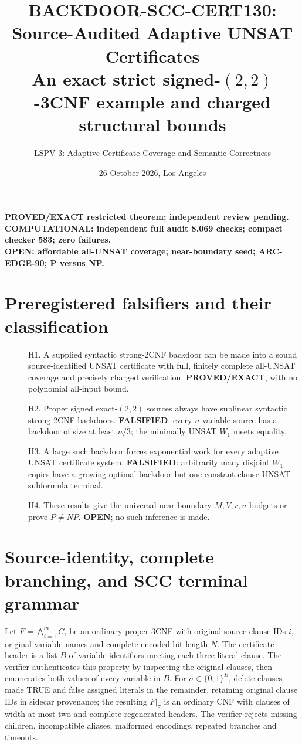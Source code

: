 \documentclass[11pt]{article}
\title{BACKDOOR-SCC-CERT130: Source-Audited Adaptive UNSAT Certificates\\
\large An exact strict signed-$(2,2)$-3CNF example and charged structural bounds}
\author{LSPV-3: Adaptive Certificate Coverage and Semantic Correctness}
\date{26 October 2026, Los Angeles}
\begin{document}
\maketitle
\begin{center}\textbf{PROVED/EXACT restricted theorem; independent review pending.}\\
\textbf{COMPUTATIONAL: independent full audit 8,069 checks; compact checker 583; zero failures.}\\
\textbf{OPEN: affordable all-UNSAT coverage; near-boundary seed; ARC-EDGE-90; P versus NP.}
\end{center}
\section{Preregistered falsifiers and their classification}
\begin{description}
\item[] H1. A supplied syntactic strong-2CNF backdoor can be made into a sound source-identified UNSAT certificate with full, finitely complete all-UNSAT coverage and precisely charged verification. \textbf{PROVED/EXACT}, with no polynomial all-input bound.
\item[] H2. Proper signed exact-$(2,2)$ sources always have sublinear syntactic strong-2CNF backdoors. \textbf{FALSIFIED}: every $n$-variable source has a backdoor of size at least $n/3$; the minimally UNSAT $W_1$ meets equality.
\item[] H3. A large such backdoor forces exponential work for every adaptive UNSAT certificate system. \textbf{FALSIFIED}: arbitrarily many disjoint $W_1$ copies have a growing optimal backdoor but one constant-clause UNSAT subformula terminal.
\item[] H4. These results give the universal near-boundary $M,V,r,u$ budgets or prove $P\ne NP$. \textbf{OPEN}; no such inference is made.
\end{description}
\section{Source-identity, complete branching, and SCC terminal grammar}
Let $F=\bigwedge_{i=1}^m C_i$ be an ordinary proper 3CNF with original source clause IDs $i$, original variable names and complete encoded bit length $N$. The certificate header is a list $B$ of variable identifiers meeting each three-literal clause. The verifier authenticates this property by inspecting the original clauses, then enumerates both values of every variable in $B$. For $\sigma\in\{0,1\}^B$, delete clauses made TRUE and false assigned literals in the remainder, retaining original clause IDs in sidecar provenance; the resulting $F|_\sigma$ is an ordinary CNF with clauses of width at most two and complete regenerated headers. The verifier rejects missing children, incompatible aliases, malformed encodings, repeated branches and timeouts.
\end{document}
